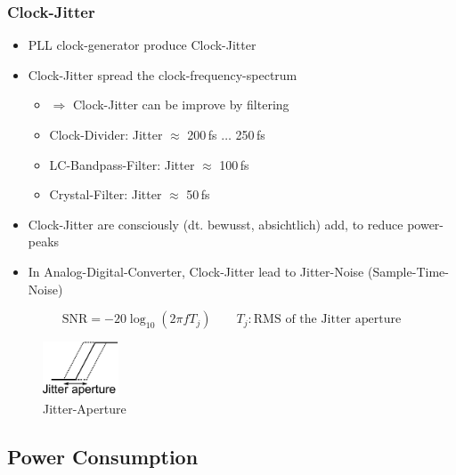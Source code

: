 \subsubsection{Clock-Jitter}
\begin{itemize}
	\item PLL clock-generator produce Clock-Jitter
	\item Clock-Jitter spread the clock-frequency-spectrum
	\begin{itemize}
		\item $\Rightarrow$  Clock-Jitter can be improve by filtering
		\item Clock-Divider: Jitter $\approx$ 200\,fs $\ldots$ 250\,fs
		\item LC-Bandpass-Filter: Jitter $\approx$ 100\,fs
		\item Crystal-Filter: Jitter $\approx$ 50\,fs
	\end{itemize}
	\item Clock-Jitter are consciously (dt. bewusst, absichtlich) add, to reduce power-peaks
	\item In Analog-Digital-Converter, Clock-Jitter lead to Jitter-Noise (Sample-Time-Noise)
\end{itemize}

\begin{equation*}
	\boxed{\text{SNR} = -20 \log_{10} \left( 2 \pi f T_j \right) \qquad T_j: \text{RMS of the Jitter aperture}}
\end{equation*}

\begin{figure}[h]
	\centering
	\includegraphics[width=0.2\textwidth]{images/High_Speed_Digital/Jitter-Aperture.pdf}
	\caption{Jitter-Aperture}
\end{figure}
\subsection{Power Consumption}
